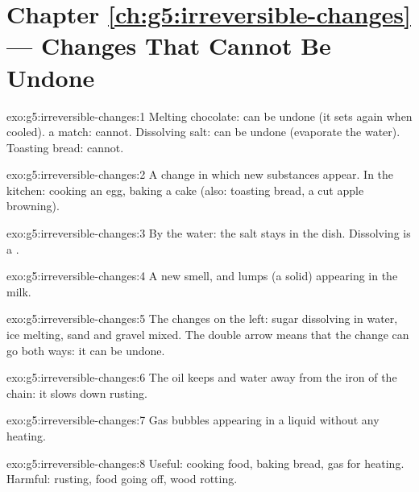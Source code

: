 \section*{Chapter \ref{ch:g5:irreversible-changes} --- Changes That Cannot Be Undone}

\begin{solution}{exo:g5:irreversible-changes:1}
Melting chocolate: can be undone (it sets again when cooled).  a
match: cannot. Dissolving salt: can be undone (evaporate the water).
Toasting bread: cannot.
\end{solution}

\begin{solution}{exo:g5:irreversible-changes:2}
A change in which new substances appear. In the kitchen: cooking an egg,
baking a cake (also: toasting bread, a cut apple browning).
\end{solution}

\begin{solution}{exo:g5:irreversible-changes:3}
By  the water: the salt stays in the dish. Dissolving is a
.
\end{solution}

\begin{solution}{exo:g5:irreversible-changes:4}
A new smell, and lumps (a solid) appearing in the milk.
\end{solution}

\begin{solution}{exo:g5:irreversible-changes:5}
The changes on the left: sugar dissolving in water, ice melting, sand
and gravel mixed. The double arrow means that the change can go both
ways: it can be undone.
\end{solution}

\begin{solution}{exo:g5:irreversible-changes:6}
The oil keeps  and water away from the iron of the chain: it slows
down rusting.
\end{solution}

\begin{solution}{exo:g5:irreversible-changes:7}
Gas bubbles appearing in a liquid without any heating.
\end{solution}

\begin{solution}{exo:g5:irreversible-changes:8}
Useful: cooking food, baking bread,  gas for heating. Harmful:
rusting, food going off, wood rotting.
\end{solution}

